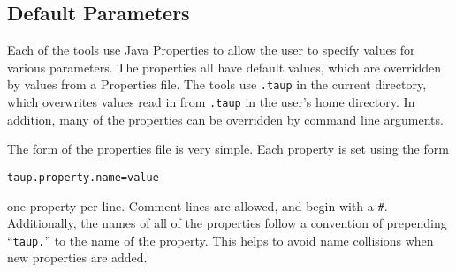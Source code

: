\subsection{Default Parameters} \label{properties}

Each of the tools use Java Properties to allow the user to specify values 
for various
parameters. The properties all have default values, which are overridden by
values from a Properties file. The tools use \texttt{.taup} in the 
current directory, which overwrites values read in from 
\texttt{.taup} in the user's home directory.
In addition, many of the properties can be overridden by command line arguments.

The form of the properties file is very simple. Each property is set using
the form 
\begin{verbatim}
taup.property.name=value
\end{verbatim}
 one property per line.
Comment lines are allowed, and begin with a \texttt{\#}.
Additionally, the names of all of the properties follow a convention of
prepending ``\texttt{taup.}'' to the name of the property. 
This helps to avoid name collisions when new properties
are added.

